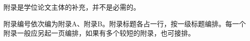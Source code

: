 
\begin{thesisappendix}
    附录是学位论文主体的补充，并不是必需的。
    
    附录编号依次编为附录A、附录B。附录标题各占一行，按一级标题编排。每一个附录一般应另起一页编排，如果有多个较短的附录，也可接排。
\end{thesisappendix}


